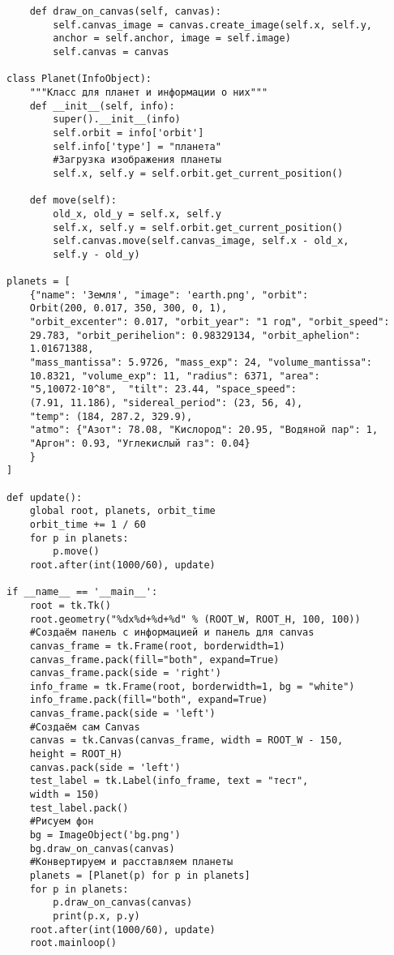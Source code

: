 \documentclass[a4paper,14pt]{extarticle}
\begin{document}
\begin{verbatim}
    def draw_on_canvas(self, canvas):
        self.canvas_image = canvas.create_image(self.x, self.y,
        anchor = self.anchor, image = self.image)
        self.canvas = canvas

class Planet(InfoObject):
    """Класс для планет и информации о них"""
    def __init__(self, info):
        super().__init__(info)
        self.orbit = info['orbit']
        self.info['type'] = "планета"
        #Загрузка изображения планеты
        self.x, self.y = self.orbit.get_current_position()
    
    def move(self):
        old_x, old_y = self.x, self.y
        self.x, self.y = self.orbit.get_current_position()
        self.canvas.move(self.canvas_image, self.x - old_x,
        self.y - old_y)

planets = [
    {"name": 'Земля', "image": 'earth.png', "orbit":
    Orbit(200, 0.017, 350, 300, 0, 1),
    "orbit_excenter": 0.017, "orbit_year": "1 год", "orbit_speed":
    29.783, "orbit_perihelion": 0.98329134, "orbit_aphelion":
    1.01671388,
    "mass_mantissa": 5.9726, "mass_exp": 24, "volume_mantissa":
    10.8321, "volume_exp": 11, "radius": 6371, "area":
    "5,10072⋅10^8",  "tilt": 23.44, "space_speed":
    (7.91, 11.186), "sidereal_period": (23, 56, 4),
    "temp": (184, 287.2, 329.9),
    "atmo": {"Азот": 78.08, "Кислород": 20.95, "Водяной пар": 1,
    "Аргон": 0.93, "Углекислый газ": 0.04}
    }
]

def update():
    global root, planets, orbit_time
    orbit_time += 1 / 60
    for p in planets:
        p.move()
    root.after(int(1000/60), update)

if __name__ == '__main__':
    root = tk.Tk()
    root.geometry("%dx%d+%d+%d" % (ROOT_W, ROOT_H, 100, 100))
    #Создаём панель с информацией и панель для canvas
    canvas_frame = tk.Frame(root, borderwidth=1)
    canvas_frame.pack(fill="both", expand=True)
    canvas_frame.pack(side = 'right')
    info_frame = tk.Frame(root, borderwidth=1, bg = "white")
    info_frame.pack(fill="both", expand=True)
    canvas_frame.pack(side = 'left')
    #Создаём сам Canvas
    canvas = tk.Canvas(canvas_frame, width = ROOT_W - 150, 
    height = ROOT_H)
    canvas.pack(side = 'left')
    test_label = tk.Label(info_frame, text = "тест",
    width = 150)
    test_label.pack()
    #Рисуем фон
    bg = ImageObject('bg.png')
    bg.draw_on_canvas(canvas)
    #Конвертируем и расставляем планеты
    planets = [Planet(p) for p in planets]
    for p in planets:
        p.draw_on_canvas(canvas)
        print(p.x, p.y)
    root.after(int(1000/60), update)
    root.mainloop()
\end{verbatim}
\end{document}
